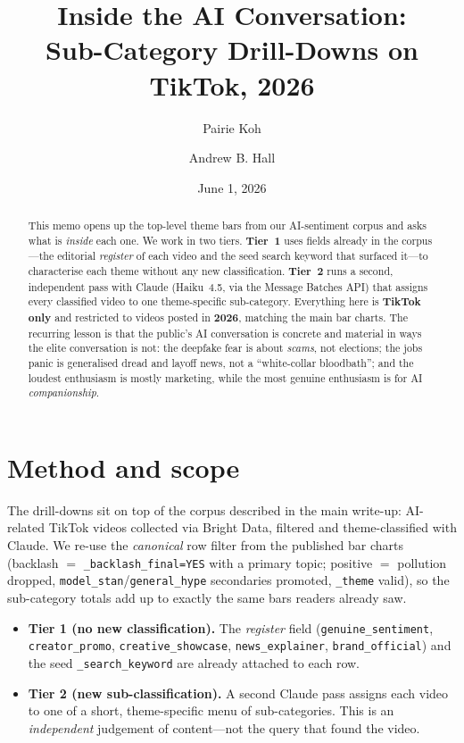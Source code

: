 \documentclass[11pt]{article}
\title{\textbf{Inside the AI Conversation:\\ Sub-Category Drill-Downs on TikTok, 2026}}
\author{Pairie Koh \and Andrew B. Hall}
\date{June 1, 2026}
\begin{document}
\maketitle

\begin{abstract}
\noindent This memo opens up the top-level theme bars from our AI-sentiment
corpus and asks what is \emph{inside} each one. We work in two tiers.
\textbf{Tier~1} uses fields already in the corpus---the editorial
\emph{register} of each video and the seed search keyword that surfaced
it---to characterise each theme without any new classification.
\textbf{Tier~2} runs a second, independent pass with Claude (Haiku~4.5, via the
Message Batches API) that assigns every classified video to one theme-specific
sub-category. Everything here is \textbf{TikTok only} and restricted to videos
posted in \textbf{2026}, matching the main bar charts. The recurring lesson is
that the public's AI conversation is concrete and material in ways the elite
conversation is not: the deepfake fear is about \emph{scams}, not elections;
the jobs panic is generalised dread and layoff news, not a ``white-collar
bloodbath''; and the loudest enthusiasm is mostly marketing, while the most
genuine enthusiasm is for AI \emph{companionship}.
\end{abstract}

\tableofcontents
\bigskip

\section{Method and scope}

The drill-downs sit on top of the corpus described in the main write-up:
AI-related TikTok videos collected via Bright Data, filtered and theme-classified
with Claude. We re-use the \emph{canonical} row filter from the published bar
charts (backlash $=$ \texttt{\_backlash\_final=YES} with a primary topic;
positive $=$ pollution dropped, \texttt{model\_stan}/\texttt{general\_hype}
secondaries promoted, \texttt{\_theme} valid), so the sub-category totals add up
to exactly the same bars readers already saw.

\begin{itemize}
  \item \textbf{Tier 1 (no new classification).} The \emph{register} field
  (\texttt{genuine\_sentiment}, \texttt{creator\_promo},
  \texttt{creative\_showcase}, \texttt{news\_explainer}, \texttt{brand\_official})
  and the seed \texttt{\_search\_keyword} are already attached to each row.
  \item \textbf{Tier 2 (new sub-classification).} A second Claude pass assigns
  each video to one of a short, theme-specific menu of sub-categories. This is an
  \emph{independent} judgement of content---not the query that found the video.
\end{itemize}
\end{document}

